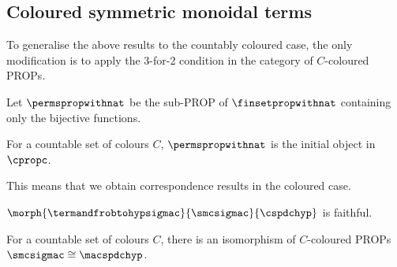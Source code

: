 \subsection{Coloured symmetric monoidal terms}

To generalise the above results to the countably coloured case, the only
modification is to apply the 3-for-2 condition in the category of \(C\)-coloured
PROPs.

\begin{lemma}
    Let \(\permspropwithnat\) be the sub-PROP of \(\finsetpropwithnat\)
    containing only the bijective functions.
\end{lemma}

\begin{lemma}
    For a countable set of colours \(C\), \(\permspropwithnat\) is the initial
    object in \(\cpropc\).
\end{lemma}

This means that we obtain correspondence results in the coloured case.

\begin{proposition}
    \(\morph{\termandfrobtohypsigmac}{\smcsigmac}{\cspdchyp}\) is faithful.
\end{proposition}

\begin{corollary}
    For a countable set of colours \(C\), there is an isomorphism of
    \(C\)-coloured PROPs \(\smcsigmac \cong \macspdchyp\).
\end{corollary}